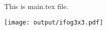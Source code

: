 \documentclass{article}
\begin{document}
    

This is main.tex file.

% 
\texttt{[image: output/ifog3x3.pdf]}
\end{document}
